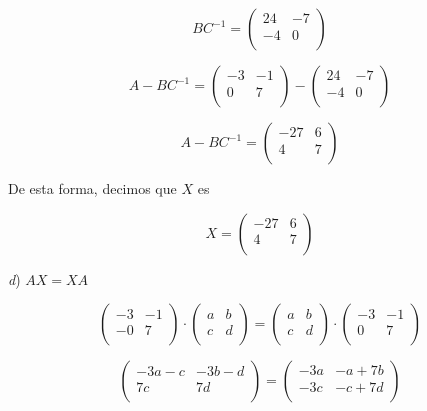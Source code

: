 \documentclass[11pt,a4paper]{article}
\begin{document}
\begin{enumerate}
$$
BC^{-1} =
\begin{pmatrix} 
24 & -7 \\
-4  & 0 \\
\end{pmatrix}
$$

$$
A-BC^{-1} =
\begin{pmatrix} 
-3 & -1 \\
0  & 7 \\
\end{pmatrix}
-
\begin{pmatrix} 
24 & -7 \\
-4 & 0 \\
\end{pmatrix}
$$

$$
A-BC^{-1} =
\begin{pmatrix} 
-27 & 6 \\
4  & 7 \\
\end{pmatrix}
$$

De esta forma, decimos que $X$ es 

$$
X =
\begin{pmatrix} 
-27 & 6 \\
4  & 7 \\
\end{pmatrix}
$$

\vspace{0.5cm}

\textit{d}) $AX=XA$

$$
\begin{pmatrix} 
-3 & -1 \\
-0  & 7 \\
\end{pmatrix}
\cdot
\begin{pmatrix} 
a & b \\
c  & d \\
\end{pmatrix}
=
\begin{pmatrix} 
a & b \\
c  & d \\
\end{pmatrix}
\cdot
\begin{pmatrix} 
-3 & -1 \\
0  & 7 \\
\end{pmatrix}
$$

$$
\begin{pmatrix} 
-3a-c & -3b-d \\
7c  & 7d \\
\end{pmatrix}
=
\begin{pmatrix} 
-3a & -a+7b \\
-3c  & -c+7d \\
\end{pmatrix}
$$


\end{enumerate}
\end{document}
